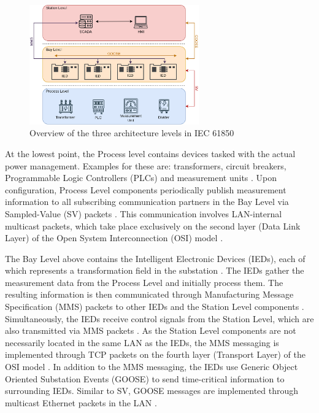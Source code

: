 \documentclass[conference, onecolumn, a4paper]{IEEEtran}
\begin{document}
\begin{figure}[h]
    \centering
    \includegraphics[width=0.65\textwidth]{images/IEC61850_Architecture.png}
    \caption{Overview of the three architecture levels in IEC 61850 \cite{SGRWin_IEC61850Architecture:2021}}
    \label{image:IEC61850Architecture}
\end{figure}

\noindent At the lowest point, the Process level contains devices tasked with the actual power management. Examples for these are: transformers, circuit 
breakers, Programmable Logic Controllers (PLCs) and measurement units \cite{SGRWin_IEC61850Architecture:2021}. Upon configuration, Process Level components 
periodically publish measurement information to all subscribing communication partners in the Bay Level via Sampled-Value (SV) packets 
\cite{TyphoonHIL_IEC61850SV:2021}. This communication involves LAN-internal multicast packets, which take place exclusively on the second layer 
(Data Link Layer) of the Open System Interconnection (OSI) model \cite{TyphoonHIL_IEC61850SV:2021}. 

\smallskip
The Bay Level above contains the Intelligent Electronic Devices (IEDs), each of which represents a transformation field in the substation 
\cite[p. 29]{IEC61850-7-1:2011}. The IEDs gather the measurement data from the Process Level and initially process them. The resulting information 
is then communicated through Manufacturing Message Specification (MMS) packets to other IEDs and the Station Level components \cite[p. 44]{IEC61850-8-1:2011}. 
Simultaneously, the IEDs receive control signals from the Station Level, which are also transmitted via MMS packets \cite{trafficGen_IEC61850:2011}. 
As the Station Level components are not necessarily located in the same LAN as the IEDs, the MMS messaging is implemented through TCP packets on the 
fourth layer (Transport Layer) of the OSI model \cite[p. 45]{IEC61850-8-1:2011}. In addition to the MMS messaging, the IEDs use Generic Object 
Oriented Substation Events (GOOSE) to send time-critical information to surrounding IEDs. Similar to SV, GOOSE messages are implemented through 
multicast Ethernet packets in the LAN \cite{GOOSE_confidentiality_integrity:2020}.
\end{document}
